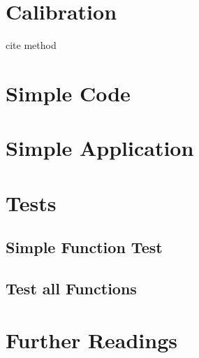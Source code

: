
\section{Calibration}

cite method

\section{Simple Code}


\section{Simple Application}



\section{Tests}

\subsection{Simple Function Test}

\subsection{Test all Functions}



\section{Further Readings}

